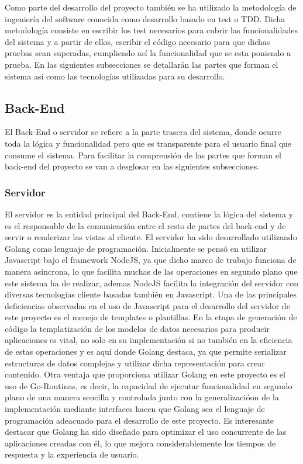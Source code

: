 \documentclass[a4paper,11pt]{book}
\begin{document}
Como parte del desarrollo del proyecto también se ha utilizado la metodología de ingeniería del software conocida como desarrollo basado en test o TDD. Dicha metodología consiste en escribir los test necesarios para cubrir las funcionalidades del sistema y a partir de ellos, escribir el código necesario para que dichas pruebas sean superadas, cumpliendo así la funcionalidad que se esta poniendo a prueba.  En las siguientes subsecciones se detallarán las partes que forman el sistema así como las tecnologías utilizadas para su desarrollo.

\subsection{Back-End}

El Back-End o servidor se refiere a la parte trasera del sistema, donde ocurre toda la lógica y funcionalidad pero que es transparente para el usuario final que consume el sistema. Para facilitar la comprensión de las partes que forman  el back-end del proyecto se van a desglosar en las siguientes subsecciones.

\subsubsection{Servidor}

El servidor es la entidad principal del Back-End, contiene la lógica del sistema y es el responsable de la comunicación entre el resto de partes del back-end y de servir o renderizar las vistas al cliente.
El servidor ha sido desarrollado utilizando Golang\cite{go} como lenguaje de programación. Inicialmente se pensó en utilizar Javascript bajo el framework NodeJS, ya que dicho marco de trabajo funciona de manera asíncrona, lo que facilita muchas de las operaciones en segundo plano que este sistema ha de realizar, ademas NodeJS facilita la integración del servidor con diversas tecnologías cliente basadas también en Javascript. Una de las principales deficiencias  observadas en el uso de Javascript para el desarrollo del servidor de este proyecto es el menejo de templates o plantillas.
En la etapa de generación de código la templatización de los modelos de datos necesarios para producir aplicaciones es vital, no solo en su implementación si no también en la eficiencia de estas operaciones y es aquí donde Golang destaca, ya que permite serializar estructuras de datos complejas y utilizar dicha representación para crear contenido. Otra ventaja que proporciona utilizar Golang en este proyecto es el uso de Go-Routinas, es decir, la capacidad de ejecutar funcionalidad en segundo plano de una manera sencilla y controlada junto con la generalizacióon de la implementación mediante interfaces hacen que Golang sea el lenguaje de programación adeacuado para el desarrollo de este proyecto.  Es interesante destacar que Golang ha sido diseñado para optimizar el uso concurrente de las aplicaciones creadas con él, lo que mejora considerablemente los tiempos de respuesta y la experiencia de usuario.
\end{document}
